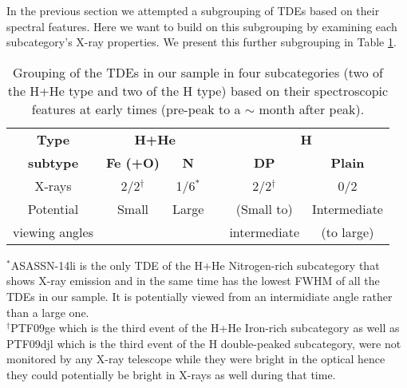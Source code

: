\documentclass[structabstract]{aa}
\begin{document}
In the previous section we attempted a subgrouping of TDEs based on their spectral features. Here we want to build on this subgrouping by examining each subcategory's X-ray properties. We present this further subgrouping in Table \ref{tab:4groups}.


\begin{table}
\setlength\tabcolsep{4pt}
\fontsize{9.4}{11}\selectfont
\caption{Grouping of the TDEs in our sample in four subcategories (two of the H+He type and two of the H type) based on their spectroscopic features at early times (pre-peak to a $\sim$ month after peak).}
\label{tab:4groups}
\begin{tabular}{c | cc p{0.2em} cc}
        \hline
        \hline
       \bf Type & \multicolumn{2}{c}{\bf H+He} & & \multicolumn{2}{c}{\bf H} \\
        \cline{1-2} \cline{2-3}  \cline{5-6}
       \bf subtype & \bf Fe (+O)  & \bf N  & & \bf DP  &\bf Plain  \\
         \cline{1-2} \cline{2-3}  \cline{5-6}
      X-rays  & 2/2$^{\dagger}$ & 1/6$^{*}$ & & 2/2$^{\dagger}$ & 0/2 \\
      \cline{1-2} \cline{2-3}  \cline{5-6}
      Potential & Small & Large & & (Small to) & Intermediate \\
      viewing angles &  &  & & intermediate & (to large) \\
        \hline
        \hline
\end{tabular}
$^{*}$ASASSN-14li is the only TDE of the H+He Nitrogen-rich subcategory that shows X-ray emission and in the same time has the lowest FWHM of all the TDEs in our sample. It is potentially viewed from an intermidiate angle rather than a large one.\\
$^{\dagger}$PTF09ge which is the third event of the H+He Iron-rich subcategory as well as PTF09djl which is the third event of the H double-peaked subcategory, were not monitored by any X-ray telescope while they were bright in the optical hence they could potentially be bright in X-rays as well during that time.
\end{table}
\end{document}
